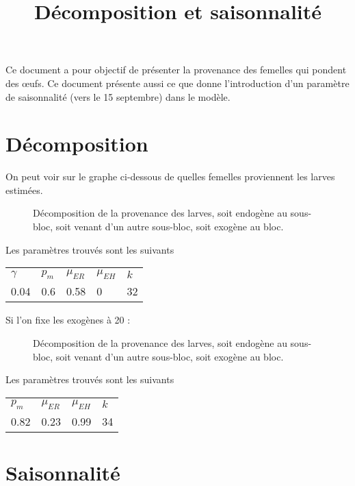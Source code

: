 \documentclass[a4paper, 11pt]{article}
\title{Décomposition et saisonnalité}
\author{}
\date{}
\begin{document}
 
\maketitle

Ce document a pour objectif de présenter la provenance des femelles qui pondent des œufs. Ce document présente aussi ce que donne l'introduction d'un paramètre de saisonnalité (vers le 15 septembre) dans le modèle.

\section{Décomposition}

On peut voir sur le graphe ci-dessous de quelles femelles proviennent les larves estimées.

\begin{figure}[!h]
\centering
{}
\caption{Décomposition de la provenance des larves, soit endogène au sous-bloc, soit venant d'un autre sous-bloc, soit exogène au bloc. }
\end{figure}

Les paramètres trouvés sont les suivants
\begin{center}
\begin{tabular}{lllll}
$\gamma$ & $p_m$ & $\mu_{ER}$ & $\mu_{EH}$ & $k$\\
0.04 & 0.6 & 0.58 & 0 & 32
\end{tabular}
\end{center}


\newpage
Si l'on fixe les exogènes à 20 :

\begin{figure}[!h]
\centering
{}
\caption{Décomposition de la provenance des larves, soit endogène au sous-bloc, soit venant d'un autre sous-bloc, soit exogène au bloc. }
\end{figure}

Les paramètres trouvés sont les suivants
\begin{center}
\begin{tabular}{llll}
$p_m$ & $\mu_{ER}$ & $\mu_{EH}$ & $k$\\
0.82 & 0.23 & 0.99 & 34
\end{tabular}
\end{center}

\section{Saisonnalité}
\end{document}
